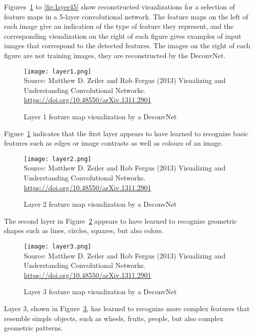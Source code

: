 Figures~\ref{fig:layer1} to \ref{fig:layer45} show reconstructed visualizations for a selection of feature maps in a 5-layer convolutional network. The feature maps on the left of each image give an indication of the type of feature they represent, and the corresponding visualization on the right of each figure gives examples of input images that correspond to the detected features. The images on the right of each figure are not training images, they are reconstructed by the DeconvNet.

\begin{figure}
\centering
\texttt{[image: layer1.png]} \\
\vspace{\baselineskip}
\scriptsize Source: Matthew D. Zeiler and Rob Fergus (2013) Visualizing and Understanding Convolutional Networks. \url{https://doi.org/10.48550/arXiv.1311.2901}
\caption{Layer 1 feature map visualization by a DeconvNet}
\label{fig:layer1}
\end{figure}

Figure~\ref{fig:layer1} indicates that the first layer appears to have learned to recognize basic features such as edges or image contrasts as well as colours of an image. 

\begin{figure}
\centering
\texttt{[image: layer2.png]} \\
\vspace{\baselineskip}
\scriptsize Source: Matthew D. Zeiler and Rob Fergus (2013) Visualizing and Understanding Convolutional Networks. \url{https://doi.org/10.48550/arXiv.1311.2901}
\caption{Layer 2 feature map visualization by a DeconvNet}
\label{fig:layer2}
\end{figure}

The second layer in Figure~\ref{fig:layer2} appears to have learned to recognize geometric shapes such as lines, circles, squares, but also colors.

\begin{figure}
\centering
\texttt{[image: layer3.png]} \\
\vspace{\baselineskip}
\scriptsize Source: Matthew D. Zeiler and Rob Fergus (2013) Visualizing and Understanding Convolutional Networks. \url{https://doi.org/10.48550/arXiv.1311.2901}
\caption{Layer 3 feature map visualization by a DeconvNet}
\label{fig:layer3}
\end{figure}

Layer 3, shown in Figure~\ref{fig:layer3}, has learned to recognize more complex features that resemble simple objects, such as wheels, fruits, people, but also complex geometric patterns. 

